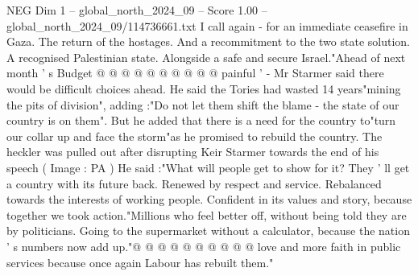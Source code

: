 \begin{textsample}{NEG Dim 1 – global\_north\_2024\_09 – Score 1.00 – global\_north\_2024\_09/114736661.txt}
I call again - for an immediate ceasefire in Gaza.
The return of the hostages.
And a recommitment to the two state solution.
A recognised Palestinian state.
Alongside a safe and secure Israel."Ahead of next month ' s Budget @ @ @ @ @ @ @ @ @ @ painful ' - Mr Starmer said there would be difficult choices ahead.
He said the Tories had wasted 14 years"mining the pits of division", adding :"Do not let them shift the blame - the state of our country is on them".
But he added that there is a need for the country to"turn our collar up and face the storm"as he promised to rebuild the country.
The heckler was pulled out after disrupting Keir Starmer towards the end of his speech ( Image : PA ) He said :"What will people get to show for it?
They ' ll get a country with its future back.
Renewed by respect and service.
Rebalanced towards the interests of working people.
Confident in its values and story, because together we took action."Millions who feel better off, without being told they are by politicians.
Going to the supermarket without a calculator, because the nation ' s numbers now add up."@ @ @ @ @ @ @ @ @ @ love and more faith in public services because once again Labour has rebuilt them."

\end{textsample}
